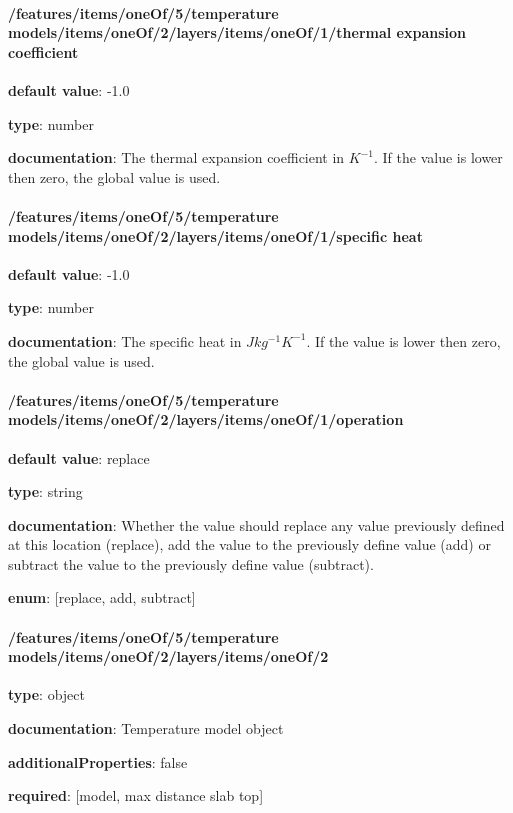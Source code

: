 \begin{itemized}
\end{itemized}\paragraph{/features/items/oneOf/5/temperature models/items/oneOf/2/layers/items/oneOf/1/thermal expansion coefficient} \begin{itemized}
\item {\bf default value}: -1.0
\item {\bf type}: number
\item {\bf documentation}: The thermal expansion coefficient in $K^{-1}$. If the value is lower then zero, the global value is used.
\end{itemized}\paragraph{/features/items/oneOf/5/temperature models/items/oneOf/2/layers/items/oneOf/1/specific heat} \begin{itemized}
\item {\bf default value}: -1.0
\item {\bf type}: number
\item {\bf documentation}: The specific heat in $J kg^{-1} K^{-1}$. If the value is lower then zero, the global value is used.
\end{itemized}\paragraph{/features/items/oneOf/5/temperature models/items/oneOf/2/layers/items/oneOf/1/operation} \begin{itemized}
\item {\bf default value}: replace
\item {\bf type}: string
\item {\bf documentation}: Whether the value should replace any value previously defined at this location (replace), add the value to the previously define value (add) or subtract the value to the previously define value (subtract).
\item {\bf enum}: [replace, add, subtract]\end{itemized}\paragraph{/features/items/oneOf/5/temperature models/items/oneOf/2/layers/items/oneOf/2} \begin{itemized}
\item {\bf type}: object
\item {\bf documentation}: Temperature model object
\item {\bf additionalProperties}: false
\item {\bf required}: [model, max distance slab top]\end{itemized}
